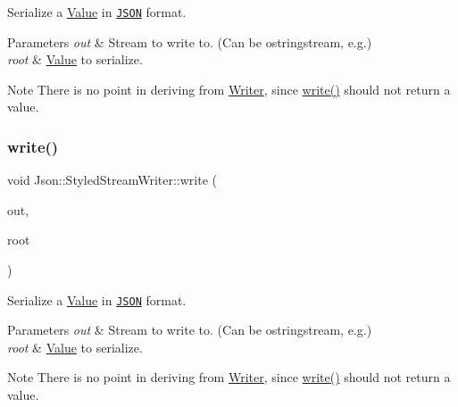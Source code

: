 Serialize a \hyperlink{class_json_1_1_value}{Value} in \href{http://www.json.org}{\tt J\+S\+ON} format. 


\begin{DoxyParams}{Parameters}
{\em out} & Stream to write to. (Can be ostringstream, e.\+g.) \\
\hline
{\em root} & \hyperlink{class_json_1_1_value}{Value} to serialize. \\
\hline
\end{DoxyParams}
\begin{DoxyNote}{Note}
There is no point in deriving from \hyperlink{class_json_1_1_writer}{Writer}, since \hyperlink{class_json_1_1_styled_stream_writer_a5d89d984fe675641e42c4370cd247774}{write()} should not return a value. 
\end{DoxyNote}
\hypertarget{class_json_1_1_styled_stream_writer_a5d89d984fe675641e42c4370cd247774}{}\label{class_json_1_1_styled_stream_writer_a5d89d984fe675641e42c4370cd247774} 
\subsubsection{\texorpdfstring{write()}{write()}\hspace{0.1cm}{\footnotesize\ttfamily [2/2]}}
{\footnotesize\ttfamily void Json\+::\+Styled\+Stream\+Writer\+::write (\begin{DoxyParamCaption}\item[{\hyperlink{config_8h_a37a25be5fca174927780caeb280094ce}{J\+S\+O\+N\+C\+P\+P\+\_\+\+O\+S\+T\+R\+E\+AM} \&}]{out,  }\item[{const \hyperlink{class_json_1_1_value}{Value} \&}]{root }\end{DoxyParamCaption})}



Serialize a \hyperlink{class_json_1_1_value}{Value} in \href{http://www.json.org}{\tt J\+S\+ON} format. 


\begin{DoxyParams}{Parameters}
{\em out} & Stream to write to. (Can be ostringstream, e.\+g.) \\
\hline
{\em root} & \hyperlink{class_json_1_1_value}{Value} to serialize. \\
\hline
\end{DoxyParams}
\begin{DoxyNote}{Note}
There is no point in deriving from \hyperlink{class_json_1_1_writer}{Writer}, since \hyperlink{class_json_1_1_styled_stream_writer_a5d89d984fe675641e42c4370cd247774}{write()} should not return a value. 
\end{DoxyNote}


